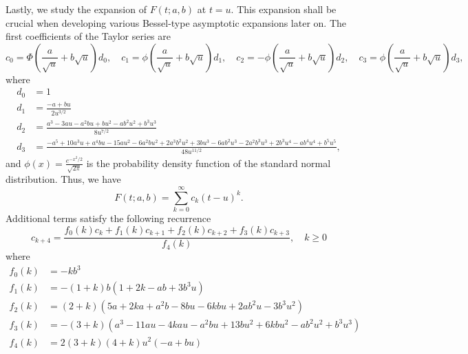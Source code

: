 \documentclass[10pt,a4paper,oneside]{article}
\numberwithin{equation}{section}
\begin{document}
Lastly, we study the expansion of $F(t;a,b)$ at $t=u$. This expansion shall be crucial when developing various Bessel-type asymptotic expansions later on. The first coefficients of the Taylor series are
\begin{equation*}
c_0 = \Phi\left(\frac{a}{\sqrt{u}} + b\sqrt{u}\right)d_0,\quad c_1 = \phi\left(\frac{a}{\sqrt{u}} + b\sqrt{u}\right) d_1, \quad c_2 = -\phi\left(\frac{a}{\sqrt{u}} + b\sqrt{u}\right) d_2, \quad
c_3 = \phi\left(\frac{a}{\sqrt{u}} + b\sqrt{u}\right) d_3,
\end{equation*}
where
\begin{align*}
d_0 &= 1\\
d_1 &= \frac{-a + bu}{2u^{3/2}}\\
d_2 &=\frac{a^3 -3au -a^2 bu + bu^2 -ab^2 u^2 + b^3u^3}{8 u^{7/2}}\\
d_3 &= \frac{-a^5 +10a^3u + a^4bu -15au^2 - 6a^2bu^2 + 2a^3 b^2 u^2 +3bu^3 -6ab^2u^3 - 2a^2b^3 u^3 + 2b^3 u^4 -ab^4u^4 + b^5 u^5}{48 u^{11/2}},
\end{align*}
and $\phi(x) = \frac{e^{-x^2/2}}{\sqrt{2\pi}}$ is the probability density function of the standard normal distribution. Thus, we have
\begin{equation}\label{phi_expansion_at_u}
F(t; a, b) = \sum_{k=0}^{\infty} c_k (t-u)^k.
\end{equation}
Additional terms satisfy the following recurrence
\begin{equation}
c_{k+4} = \frac{f_0(k) c_k + f_1(k) c_{k+1} + f_2(k) c_{k+2} + f_3(k) c_{k+3}}{f_4(k)}, \quad k \ge 0
\end{equation}
where
\begin{align*}
f_0(k) &= -kb^3\\
f_1(k) &= -(1 + k) b (1 + 2k -ab + 3b^3u)\\
f_2(k) &= (2 + k)(5a + 2ka +a^2b - 8bu - 6kbu +2ab^2u -3b^3u^2)\\
f_3(k) &= -(3 + k)(a^3 - 11au -4kau - a^2bu + 13bu^2 + 6kbu^2 -ab^2u^2 + b^3 u^3)\\
f_4(k) &= 2 (3 + k) (4 + k) u^2 (-a + bu)
\end{align*}
\end{document}
